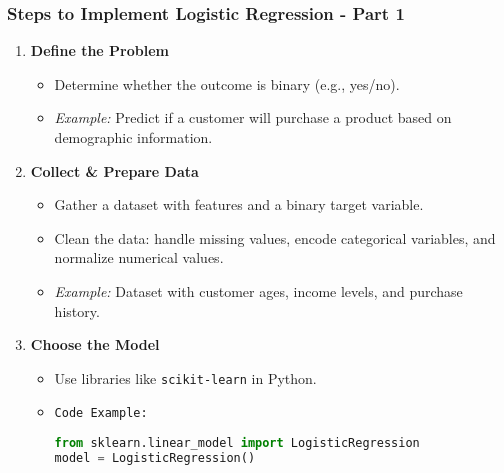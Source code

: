\documentclass[aspectratio=169]{beamer}
\begin{document}
\begin{frame}
    \frametitle{Steps to Implement Logistic Regression - Part 1}
    \begin{enumerate}
        \item \textbf{Define the Problem}
        \begin{itemize}
            \item Determine whether the outcome is binary (e.g., yes/no).
            \item \textit{Example:} Predict if a customer will purchase a product based on demographic information.
        \end{itemize}

        \item \textbf{Collect \& Prepare Data}
        \begin{itemize}
            \item Gather a dataset with features and a binary target variable.
            \item Clean the data: handle missing values, encode categorical variables, and normalize numerical values.
            \item \textit{Example:} Dataset with customer ages, income levels, and purchase history.
        \end{itemize}

        \item \textbf{Choose the Model}
        \begin{itemize}
            \item Use libraries like \texttt{scikit-learn} in Python.
            \item \texttt{Code Example:}
            \begin{lstlisting}[language=Python]
from sklearn.linear_model import LogisticRegression
model = LogisticRegression()
            \end{lstlisting}
        \end{itemize}
    \end{enumerate}
\end{frame}
\end{document}
